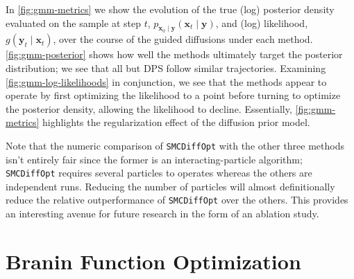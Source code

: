 In \autoref{fig:gmm-metrics} we show the evolution of the true (log) posterior density evaluated on the
sample at step $t$, $p_{\mathbf{x}_0 \mid \mathbf{y}}(\mathbf{x}_t \mid \mathbf{y})$, and (log)
likelihood, $g(\mathbf{y}_t \mid \mathbf{x}_t)$, over the course of the guided diffusions under
each method. \autoref{fig:gmm-posterior} shows how well the methods ultimately target the posterior
distribution; we see that all but DPS follow similar trajectories.
Examining \autoref{fig:gmm-log-likelihoods} in conjunction, we see that the methods appear to operate
by first optimizing the likelihood to a point before turning to optimize the posterior density,
allowing the likelihood to decline. Essentially, \autoref{fig:gmm-metrics} highlights the regularization
effect of the diffusion prior model.

Note that the numeric comparison of \texttt{SMCDiffOpt} with the other three methods isn't entirely
fair since the former is an interacting-particle algorithm; \texttt{SMCDiffOpt} requires several
particles to operates whereas the others are independent runs. Reducing the number of particles
will almost definitionally reduce the relative outperformance of \texttt{SMCDiffOpt} over the
others. This provides an interesting avenue for future research in the form of an ablation study.

\section{Branin Function Optimization} \label{sec:branin}

